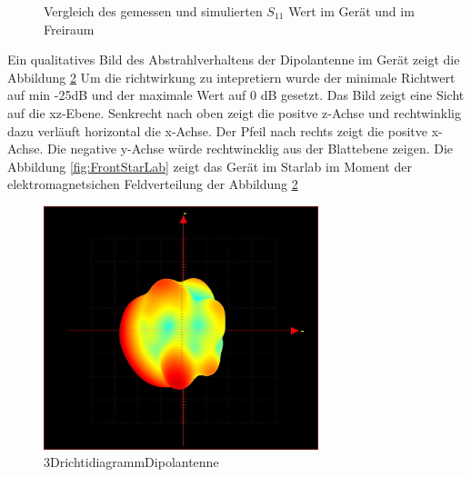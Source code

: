 %	

\begin{figure}[!ht]
	\centering
	\begingroup
	
	\endgroup
	\caption{Vergleich des gemessen und simulierten $S_{11}$ Wert im Ger\"at und im Freiraum}	\label{S11_Messung_Simulation_Dipolantenn_Freiraum}
\end{figure}
\newpage
Ein qualitatives Bild des Abstrahlverhaltens der Dipolantenne im Gerät zeigt die Abbildung \ref{fig:3D Richtdiagramm} Um die richtwirkung zu intepretiern wurde der minimale Richtwert auf min -25dB und der maximale Wert auf 0 dB gesetzt. Das Bild zeigt eine Sicht auf die xz-Ebene. Senkrecht nach oben zeigt die positve z-Achse und rechtwinklig dazu verläuft horizontal die x-Achse. Der Pfeil nach rechts zeigt die positve x-Achse. Die negative y-Achse würde rechtwincklig aus der Blattebene zeigen. Die Abbildung \ref{fig:FrontStarLab} zeigt das Gerät im Starlab im Moment der elektromagnetsichen Feldverteilung der Abbildung \ref{fig:3D Richtdiagramm}\\
\begin{figure}[!h]
	\centering
	\includegraphics[width=8cm]{content/bilder/Implementierung/min25_0_x_yhinten_zoben.JPG}%
	\caption{3DrichtidiagrammDipolantenne}
	\label{fig:3D Richtdiagramm}
\end{figure}
